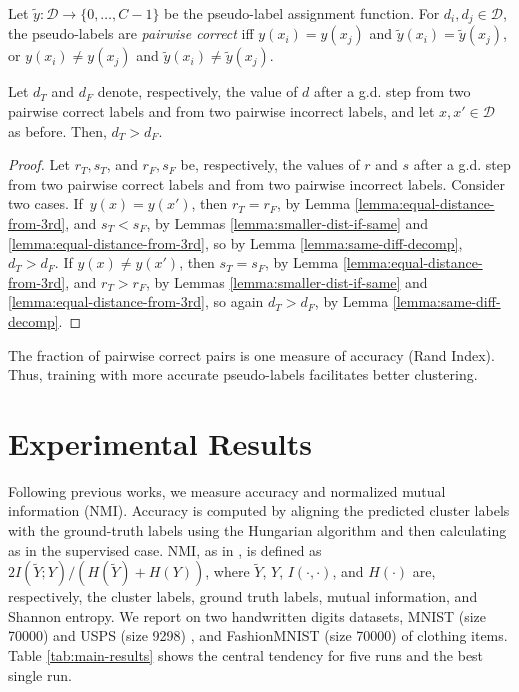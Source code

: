 \documentclass[runningheads]{llncs}
\begin{document}
\begin{definition}{\rm 
    Let $\tilde{y}:\mathcal{D} \rightarrow \{0, \dots, C-1\}$ be the pseudo-label assignment function. For  $d_i, d_j \in \mathcal{D}$, the pseudo-labels are \emph{pairwise correct} iff $y(x_i) = y(x_j)$ and $\tilde{y}(x_i) = \tilde{y}(x_j)$, or $y(x_i) \neq y(x_j)$ and $\tilde{y}(x_i) \neq \tilde{y}(x_j)$.}
\end{definition}



\begin{theorem}
    Let $d_{T}$ and $d_{F}$ denote, respectively, the value of $d$ after a g.d. step from two pairwise correct labels and from two pairwise incorrect labels, and let $x,x' \in \mathcal{D}$ as before. Then, $d_T > d_F$.
\end{theorem}
\begin{proof}
Let $r_T, s_T$, and $r_F, s_F$ be, respectively, the values of $r$ and $s$ after a g.d. step from two pairwise correct labels and from two pairwise incorrect labels.
Consider two cases. If~$y(x) = y(x')$, then $r_T = r_F$, by Lemma \ref{lemma:equal-distance-from-3rd}, and $s_T < s_F$, by Lemmas \ref{lemma:smaller-dist-if-same} and \ref{lemma:equal-distance-from-3rd}, so by Lemma \ref{lemma:same-diff-decomp}, $d_T > d_F$. If $y(x) \neq y(x')$, then $s_T = s_F$, by Lemma \ref{lemma:equal-distance-from-3rd}, and $r_T > r_F$, by Lemmas \ref{lemma:smaller-dist-if-same} and \ref{lemma:equal-distance-from-3rd}, so again $d_T > d_F$, by Lemma \ref{lemma:same-diff-decomp}.
\end{proof}
The fraction of pairwise correct pairs is one measure of accuracy (Rand Index). Thus, training with more accurate pseudo-labels facilitates better clustering. 

  
  \section{Experimental Results} \label{sec:results}
\noindent Following previous works, we measure accuracy and normalized mutual information (NMI). Accuracy is computed by aligning the predicted cluster labels with the ground-truth labels using the Hungarian algorithm \cite{kuhn1955hungarian} and then calculating as in the supervised case. NMI, as in \cite{witten2002data}, is defined as 
${2I(\tilde{Y};Y)}/({H(\tilde{Y}) + H(Y)})$, 
where $\tilde{Y}$, $Y$, $I(\cdot,\cdot)$, and $H(\cdot)$ are, respectively, the cluster labels, ground truth labels, mutual information, and Shannon entropy. We report on two handwritten digits datasets, MNIST (size 70000) \cite{lecun1998gradient} and USPS (size 9298) \cite{hull1994database}, and FashionMNIST (size 70000) \cite{xiao2017fashion} of clothing items. Table \ref{tab:main-results} shows the central tendency for five runs and the best single run.
\end{document}
